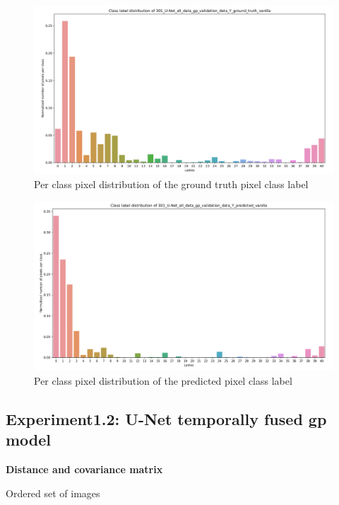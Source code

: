 	\begin{figure}
		\centering
		\includegraphics[width=16cm]{images/Y_ground_truth_vanilla.png}
		\caption{Per class pixel distribution of the ground truth pixel class label}
		\label{fig:y_gt_vanilla}
	\end{figure}

	\begin{figure}
		\centering
		\includegraphics[width=16cm]{images/Y_predicted_vanilla.png}
		\caption{Per class pixel distribution of the predicted pixel class label}
		\label{fig:y_predi_vanilla}
	\end{figure}    

    \subsection{Experiment1.2: U-Net temporally fused gp model}
    
    { \bf Distance and covariance matrix}
    
    Ordered set of images
    
